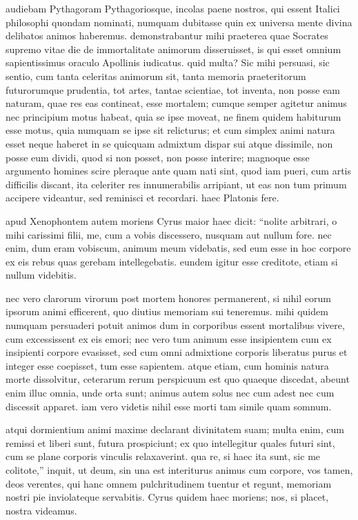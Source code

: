  audiebam Pythagoram Pythagoriosque, incolas paene nostros, qui essent Italici philosophi quondam nominati, numquam dubitasse quin ex universa mente divina delibatos animos haberemus. demonstrabantur mihi praeterea quae Socrates supremo vitae die de immortalitate animorum disseruisset, is qui esset omnium sapientissimus oraculo Apollinis iudicatus. quid multa? Sic mihi persuasi, sic sentio, cum tanta celeritas animorum sit, tanta memoria praeteritorum futurorumque prudentia, tot artes, tantae scientiae, tot inventa, non posse eam naturam, quae res eas contineat, esse mortalem; cumque semper agitetur animus nec principium motus habeat, quia se ipse moveat, ne finem quidem habiturum esse motus, quia numquam se ipse sit relicturus; et cum simplex animi natura esset neque haberet in se quicquam admixtum dispar sui atque dissimile, non posse eum dividi, quod si non posset, non posse interire; magnoque esse argumento homines scire pleraque ante quam nati sint, quod iam pueri, cum artis difficilis discant, ita celeriter res innumerabilis arripiant, ut eas non tum primum accipere videantur, sed reminisci et recordari. haec Platonis fere.

 apud Xenophontem autem moriens Cyrus maior haec dicit: ``nolite arbitrari, o mihi carissimi filii, me, cum a vobis discessero, nusquam aut nullum fore. nec enim, dum eram vobiscum, animum meum videbatis, sed eum esse in hoc corpore ex eis rebus quas gerebam intellegebatis. eundem igitur esse creditote, etiam si nullum videbitis.

 nec vero clarorum virorum post mortem honores permanerent, si nihil eorum ipsorum animi efficerent, quo diutius memoriam sui teneremus. mihi quidem numquam persuaderi potuit animos dum in corporibus essent mortalibus vivere, cum excessissent ex eis emori; nec vero tum animum esse insipientem cum ex insipienti corpore evasisset, sed cum omni admixtione corporis liberatus purus et integer esse coepisset, tum esse sapientem. atque etiam, cum hominis natura morte dissolvitur, ceterarum rerum perspicuum est quo quaeque discedat, abeunt enim illuc omnia, unde orta sunt; animus autem solus nec cum adest nec cum discessit apparet. iam vero videtis nihil esse morti tam simile quam somnum.

 atqui dormientium animi maxime declarant divinitatem suam; multa enim, cum remissi et liberi sunt, futura prospiciunt; ex quo intellegitur quales futuri sint, cum se plane corporis vinculis relaxaverint. qua re, si haec ita sunt, sic me colitote,'' inquit, ut deum, sin una est interiturus animus cum corpore, vos tamen, deos verentes, qui hanc omnem pulchritudinem tuentur et regunt, memoriam nostri pie inviolateque servabitis. Cyrus quidem haec moriens; nos, si placet, nostra videamus.

